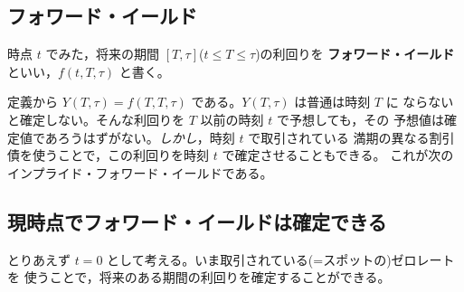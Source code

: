 \vspace{18pt}

\subsection{フォワード・イールド}

\begin{definition}
時点 $t$ でみた，将来の期間 $[T,\tau]$($t \le T \le \tau$)の利回りを
\textbf{フォワード・イールド}といい，$f(t,T,\tau)$ と書く。
\end{definition}

定義から $Y(T,\tau) = f(T,T,\tau)$ である。$Y(T,\tau)$ は普通は時刻 $T$ に
ならないと確定しない。そんな利回りを $T$ 以前の時刻 $t$ で予想しても，その
予想値は確定値であろうはずがない。\emph{しかし}，時刻 $t$ で取引されている
満期の異なる割引債を使うことで，この利回りを時刻 $t$ で確定させることもできる。
これが次のインプライド・フォワード・イールドである。

\subsection{現時点でフォワード・イールドは確定できる}

とりあえず $t=0$ として考える。いま取引されている(=スポットの)ゼロレートを
使うことで，将来のある期間の利回りを確定することができる。

